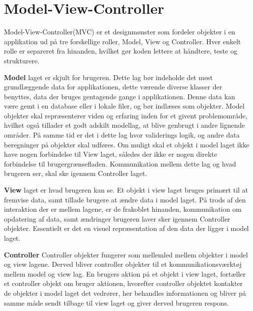 \chapter{Model-View-Controller}
Model-View-Controller(MVC) er et designmønster som fordeler 
objekter i en applikation ud på tre forskellige roller, 
Model, View og Controller. Hver enkelt rolle er separeret fra 
hinanden, hvilket gør koden lettere at håndtere, teste og strukturere.

\textbf{Model} laget er skjult for brugeren. Dette lag bør 
indeholde det mest grundlæggende data for applikationen, 
dette værende diverse klasser der benyttes, data der bruges 
gentagende gange i applikationen. Denne data kan være gemt i en database eller i lokale filer, og bør indlæses som objekter. Model 
objekter skal repræsenterer viden og erfaring inden for et 
givent problemområde, hvilket også tillader et godt adskilt 
modellag, at blive genbrugt i andre lignende områder. På 
samme tid er det i dette lag hvor validerings logik, og andre 
data beregninger på objekter skal udføres. Om muligt skal 
et objekt i model laget ikke have nogen forbindelse til 
View laget, således der ikke er nogen direkte forbindelse til 
brugergrænsefladen. Kommunikation mellem dette lag og hvad 
brugeren ser, skal ske igennem Controller laget.

\textbf{View} laget er hvad brugeren kan se. Et objekt i view 
laget bruges primært til at fremvise data, samt tillade 
brugere at ændre data i model laget. På trods af den 
interaktion der er mellem lagene, er de frakoblet hinanden, 
kommunikation om opdatering af data, samt ændringer brugeren 
laver sker igennem Controller objekter. Essentielt er det en 
visuel repræsentation af den data der ligger i model laget.

\textbf{Controller}
Controller objekter fungerer som mellemled mellem objekter i 
model og view lagene. Derved bliver controller objekter til 
et kommunikationsværktøj mellem model og view lag. En brugers 
aktion på et objekt i view laget, fortæller et controller 
objekt om bruger aktionen, hvorefter controller objektet 
kontakter de objekter i model laget det vedrører, her 
behandles informationen og bliver på samme måde sendt tilbage 
til view laget og giver derved brugeren respons.
